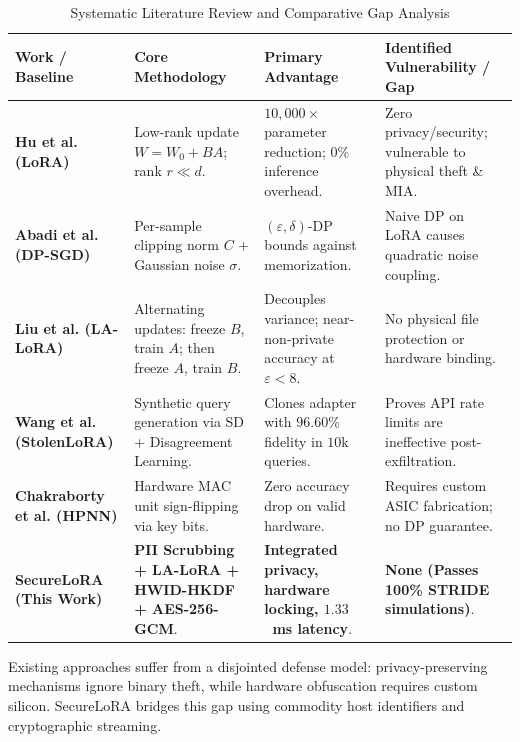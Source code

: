 \documentclass[10pt,conference,compsocconf]{IEEEtran}
\begin{document}
\begin{table}[t]
\caption{Systematic Literature Review and Comparative Gap Analysis}
\label{tab:gap_analysis}
\centering
\small
\begin{tabular}{lp{4.2cm}p{4.2cm}p{4.2cm}}
\toprule
\textbf{Work / Baseline} & \textbf{Core Methodology} & \textbf{Primary Advantage} & \textbf{Identified Vulnerability / Gap} \\
\midrule
\textbf{Hu et al. (LoRA) \cite{hu2022lora}} & Low-rank update $W = W_0 + BA$; rank $r \ll d$. & $10,000\times$ parameter reduction; $0\%$ inference overhead. & Zero privacy/security; vulnerable to physical theft \& MIA. \\
\textbf{Abadi et al. (DP-SGD) \cite{abadi2016deep}} & Per-sample clipping norm $C$ + Gaussian noise $\sigma$. & $(\varepsilon, \delta)$-DP bounds against memorization. & Naive DP on LoRA causes quadratic noise coupling. \\
\textbf{Liu et al. (LA-LoRA) \cite{liu2026lalora}} & Alternating updates: freeze $B$, train $A$; then freeze $A$, train $B$. & Decouples variance; near-non-private accuracy at $\varepsilon < 8$. & No physical file protection or hardware binding. \\
\textbf{Wang et al. (StolenLoRA) \cite{wang2025stolenlora}} & Synthetic query generation via SD + Disagreement Learning. & Clones adapter with $96.60\%$ fidelity in $10\text{k}$ queries. & Proves API rate limits are ineffective post-exfiltration. \\
\textbf{Chakraborty et al. (HPNN) \cite{chakraborty2020hpnn}} & Hardware MAC unit sign-flipping via key bits. & Zero accuracy drop on valid hardware. & Requires custom ASIC fabrication; no DP guarantee. \\
\midrule
\textbf{SecureLoRA (This Work)} & \textbf{PII Scrubbing + LA-LoRA + HWID-HKDF + AES-256-GCM}. & \textbf{Integrated privacy, hardware locking, $1.33$~ms latency}. & \textbf{None (Passes 100\% STRIDE simulations)}. \\
\bottomrule
\end{tabular}
\end{table}

Existing approaches suffer from a disjointed defense model: privacy-preserving mechanisms ignore binary theft, while hardware obfuscation requires custom silicon. SecureLoRA bridges this gap using commodity host identifiers and cryptographic streaming.

\end{document}
